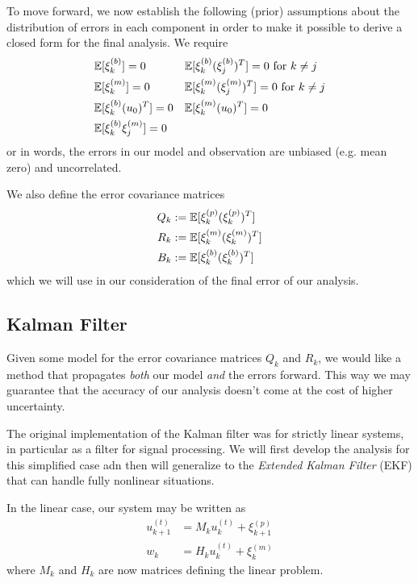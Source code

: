 To move forward, we now establish the following (prior) assumptions about the distribution of errors in each component in order to make it possible to derive a closed form for the final analysis. We require
\begin{align}
  &\E[\xi_k^{(b)}] = 0 & &\E[\xi_k^{(b)}(\xi_j^{(b)})^T] = 0 \text{ for } k\neq j\\
  &\E[\xi_k^{(m)}] = 0 & &\E[\xi_k^{(m)}(\xi_j^{(m)})^T] = 0 \text{ for } k\neq j\\
  &\E[\xi_k^{(b)}(u_0)^T] = 0 & &\E[\xi_k^{(m)}(u_0)^T] = 0\\
  &\E[\xi_k^{(b)}\xi_j^{(m)}] = 0 & &  %
\end{align}
or in words, the errors in our model and observation are unbiased (e.g. mean zero) and uncorrelated.

We also define the error covariance matrices
\begin{align}
  Q_k &:= \mathbb{E}[\xi_k^{(p)}(\xi_k^{(p)})^T] \\
  R_k &:= \mathbb{E}[\xi_k^{(m)}(\xi_k^{(m)})^T] \\
  B_k &:= \mathbb{E}[\xi_k^{(b)}(\xi_k^{(b)})^T]
\end{align}
which we will use in our consideration of the final error of our analysis.

\subsection{Kalman Filter}
Given some model for the error covariance matrices $Q_k$ and $R_k$, we would like a method that propagates \textit{both} our model \emph{and} the errors forward. This way we may guarantee that the accuracy of our analysis doesn't come at the cost of higher uncertainty.

The original implementation of the Kalman filter was for strictly linear systems, in particular as a filter for signal processing. We will first develop the analysis for this simplified case adn then will generalize to the \textit{Extended Kalman Filter} (EKF) that can handle fully nonlinear situations.

In the linear case, our system may be written as
\begin{align}
    u_{k+1}^{(t)} &= M_ku_k^{(t)} + \xi_{k+1}^{(p)} \\
    w_k &= H_ku_k^{(t)} + \xi_k^{(m)}
\end{align}
where $M_k$ and $H_k$ are now matrices defining the linear problem.

